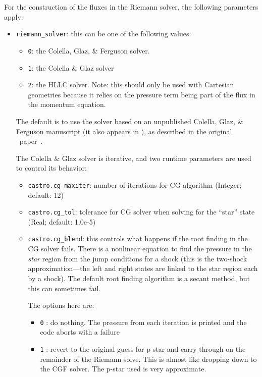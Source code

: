 For the construction of the fluxes in the Riemann solver, the following
parameters apply:
\begin{itemize}
\item {\tt riemann\_solver}: this can be one of the following values:
  \begin{itemize}
    \item {\tt 0}: the Colella, Glaz, \& Ferguson solver.  

    \item {\tt 1}: the Colella \& Glaz solver

    \item {\tt 2}: the HLLC solver.  Note: this should only be used with Cartesian
      geometries because it relies on the pressure term being part of the flux
      in the momentum equation.
  \end{itemize}

  The default is to use the solver based on an unpublished Colella,
  Glaz, \& Ferguson manuscript (it also appears in \cite{pember:1996}),
  as described in the original \castro\ paper~\cite{castro_I}.

  The Colella \& Glaz solver is iterative, and two runtime parameters are used
  to control its behavior:
  \begin{itemize}
  \item {\tt castro.cg\_maxiter}: number of iterations for CG algorithm
    (Integer; default: 12)
    
  \item {\tt castro.cg\_tol}: tolerance for CG solver when solving
     for the ``star'' state (Real; default: 1.0e-5)

  \item {\tt castro.cg\_blend}: this controls what happens if the root
     finding in the CG solver fails.  There is a nonlinear equation to find
     the pressure in the {\em star} region from the jump conditions for a 
     shock (this is the two-shock approximation---the left and right states
     are linked to the star region each by a shock).  The default root 
     finding algorithm is a secant method, but this can sometimes fail.
     
     The options here are:
     \begin{itemize}
     \item {\tt 0} : do nothing.  The pressure from each iteration is
       printed and the code aborts with a failure

     \item {\tt 1} : revert to the original guess for p-star and carry
       through on the remainder of the Riemann solve.  This is almost like
       dropping down to the CGF solver.  The p-star used is very approximate.


\end{itemize}
\end{itemize}
\end{itemize}
